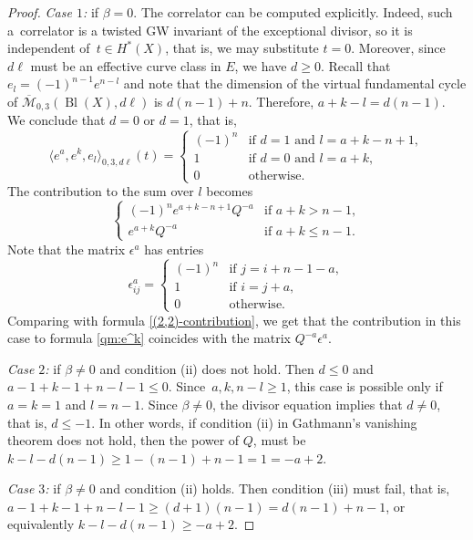 \documentclass[pdftex]{sigma}
\numberwithin{equation}{section}
\begin{document}
\begin{proof}
{\em Case $1$:} if $\beta=0$. The correlator  can be computed explicitly. Indeed, such a~correlator is a twisted GW invariant of the exceptional divisor, so it
is independent of~$t\in H^*(X)$, that is, we may substitute
$t=0$. Moreover, since $d\ell$ must be an effective curve class in
$E$, we have $d\geq 0$. Recall that $e_l= (-1)^{n-1} e^{n-l}$ and note that the
dimension of the virtual fundamental cycle of
$\overline{\mathcal{M}}_{0,3}(\operatorname{Bl}(X), d\ell) $ is $d
(n-1)+n$. Therefore, $a+k-l = d(n-1) $. We conclude that $d=0$ or
$d=1$, that is,
\[
\big\langle e^a, e^k, e_l \big\rangle_{0,3,d\ell}(t)=
\begin{cases}
(-1)^n & \mbox{if $d=1$ and $l=a+k-n+1$},\\
1 & \mbox{if $d=0$ and $l=a+k$},\\
0 & \mbox{otherwise.}
\end{cases}
\]
The contribution to the sum over $l$ becomes
\begin{equation}\label{(2,2)-contribution}
\begin{cases}
(-1)^n e^{a+k-n+1} Q^{-a} & \mbox{if $a+k>n-1$}, \\
e^{a+k} Q^{-a}& \mbox{if $a+k\leq n-1$}.
\end{cases}
\end{equation}
Note that the matrix $\epsilon^a$ has entries
\[
\epsilon^a_{ij}=
\begin{cases}
(-1)^n & \mbox{if $j=i+ n-1-a$}, \\
1 & \mbox{if $i=j+a$},\\
0 & \mbox{otherwise}.
\end{cases}
\]
Comparing with formula \eqref{(2,2)-contribution}, we get that the
contribution in this case to formula \eqref{qm:e^k} coincides with the
matrix $Q^{-a} \epsilon^a$.

{\em Case $2$:} if $\beta\neq 0$ and condition (ii) does not hold.
Then $d\leq 0$ and $a-1+k-1+n-l-1\leq 0$. Since~${a,k,n-l\geq 1}$, this
case is possible only if $a=k=1$ and $l=n-1$. Since $\beta\neq 0$, the
 divisor equation implies that $d\neq 0$, that is, $d\leq -1$. In
 other words, if condition (ii) in Gathmann's
 vanishing theorem does not hold, then the power of $Q$, must be
 $k-l-d(n-1)\geq 1-(n-1) + n-1 =1=-a+2$.

{\em Case $3$:} if $\beta\neq 0$ and condition (ii) holds.
Then condition (iii) must fail, that is, $a-1+k-1+n-l-1\geq
(d+1)(n-1)=d(n-1) +n-1$, or equivalently
 $k-l-d(n-1)\geq -a+2$.


\end{proof}
\end{document}
